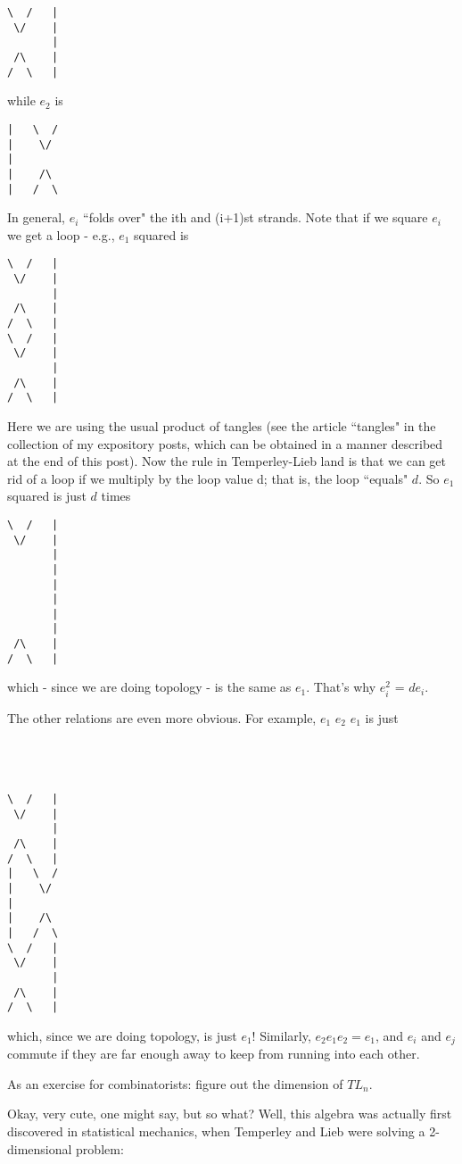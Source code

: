 \begin{verbatim}
\  /   |
 \/    |
       |
 /\    |
/  \   |

\end{verbatim}
while $e_2$ is
\begin{verbatim}
|   \  /  
|    \/   
|      
|    /\   
|   /  \  

\end{verbatim}
In general, $e_i$ ``folds over" the ith and (i+1)st strands. Note that if we square $e_i$ we get a loop - e.g., $e_1$ squared is
\begin{verbatim}
\  /   |
 \/    |
       |
 /\    |
/  \   |
\  /   |
 \/    |
       |
 /\    |
/  \   |
\end{verbatim}
Here we are using the usual product of tangles (see the article ``tangles" in the collection of my expository posts, which can be obtained in a manner described at the end of this post). Now the rule in Temperley-Lieb land is that we can get rid of a loop if we multiply by the loop value d; that is, the loop ``equals" $d$. So $e_1$ squared is just $d$ times 
\begin{verbatim}
\  /   |
 \/    |
       |
       |
       |
       |
       |
       |
 /\    |
/  \   |

\end{verbatim}

which - since we are doing topology - is the same as $e_1$. That's why $e_i^2$ = $de_i$.

The other relations are even more obvious. For example, $e_1$ $e_2$ $e_1$ is just \\
\\
\\
\\

\begin{verbatim}
\  /   |
 \/    |
       |
 /\    |
/  \   |
|   \  /  
|    \/   
|      
|    /\   
|   /  \  
\  /   |
 \/    |
       |
 /\    |
/  \   |
\end{verbatim}
which, since we are doing topology, is just $e_1$! Similarly, $e_2 e_1 e_2 = e_1$, and $e_i$ and $e_j$ commute if they are far enough away to keep from running into each other.

As an exercise for combinatorists: figure out the dimension of $TL_n$.

Okay, very cute, one might say, but so what? Well, this algebra was actually first discovered in statistical mechanics, when Temperley and Lieb were solving a 2-dimensional problem:

